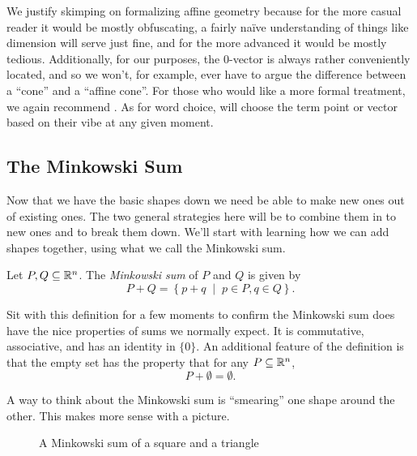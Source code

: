\documentclass[12pt,oneside]{../../sfsuthesis}
\begin{document}
We justify skimping on formalizing affine geometry because for the more casual reader it would be mostly obfuscating, a fairly na\"ive understanding of things like dimension will serve just fine, and for the more advanced it would be mostly tedious.
Additionally, for our purposes, the \( 0 \)-vector is always rather conveniently located, and so we won't, for example, ever have to argue the difference between a ``cone'' and a ``affine cone''.
For those who would like a more formal treatment, we again recommend \cite{zieglerLecturesPolytopes1995}.
As for word choice, will choose the term point or vector based on their vibe at any given moment.

\subsection{The Minkowski Sum}
Now that we have the basic shapes down we need be able to make new ones out of existing ones.
The two general strategies here will be to combine them in to new ones and to break them down.
We'll start with learning how we can add shapes together, using what we call the Minkowski sum.
\begin{definition}\th\label{def:MinkowskiSum}
    Let \( P, Q \subseteq \mathbb{R}^n \).
    The \emph{Minkowski sum} of \( P \) and \( Q \) is given by
    \[
        P + Q = \left\{ p + q \; \middle| \; p \in P, q \in Q \right\}.
    \]
\end{definition}
Sit with this definition for a few moments to confirm the Minkowski sum does have the nice properties of sums we normally expect.
It is commutative, associative, and has an identity in \( \{ 0 \} \).
An additional feature of the definition is that the empty set has the property that for any \( P \subseteq \mathbb{R}^n \),
\[
    P + \emptyset = \emptyset.
\]

A way to think about the Minkowski sum is ``smearing'' one shape around the other.
This makes more sense with a picture.
\begin{figure}[H]
    \centering
    \caption{A Minkowski sum of a square and a triangle}
\end{figure}
\end{document}
